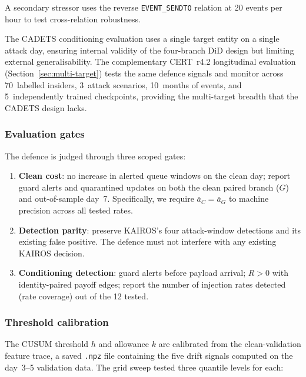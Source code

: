\documentclass[10pt,twocolumn]{article}
\begin{document}
A secondary stressor uses the reverse \texttt{EVENT\_SENDTO} relation at
20 events per hour to test cross-relation robustness.

The CADETS conditioning evaluation uses a single target entity on a single
attack day, ensuring internal validity of the four-branch DiD design but
limiting external generalisability.  The complementary CERT~r4.2
longitudinal evaluation (Section~\ref{sec:multi-target}) tests the same
defence signals and monitor across 70~labelled insiders, 3~attack
scenarios, 10~months of events, and 5~independently trained checkpoints,
providing the multi-target breadth that the CADETS design lacks.

\subsubsection{Evaluation gates}

The defence is judged through three scoped gates:
\begin{enumerate}
  \item \textbf{Clean cost}: no increase in alerted queue windows on the
    clean day; report guard alerts and quarantined updates on both the
    clean paired branch ($G$) and out-of-sample day~7.  Specifically,
    we require $\bar{a}_C = \bar{a}_G$ to machine precision across
    all tested rates.
  \item \textbf{Detection parity}: preserve KAIROS's four attack-window
    detections and its existing false positive.  The defence must not
    interfere with any existing KAIROS decision.
  \item \textbf{Conditioning detection}: guard alerts before payload
    arrival; $R>0$ with identity-paired payoff edges; report the number
    of injection rates detected (rate coverage) out of the 12 tested.
\end{enumerate}

\subsubsection{Threshold calibration}

The CUSUM threshold $h$ and allowance $k$ are calibrated from the
clean-validation feature trace, a saved \texttt{.npz} file containing
the five drift signals computed on the day~3--5 validation data.  The
grid sweep tested three quantile levels for each:
\end{document}
